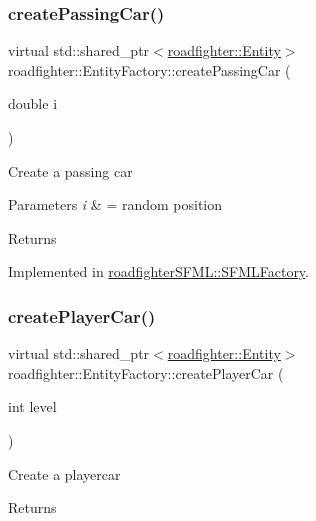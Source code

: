 \subsubsection{\texorpdfstring{create\+Passing\+Car()}{createPassingCar()}}
{\footnotesize\ttfamily virtual std\+::shared\+\_\+ptr$<$\hyperlink{classroadfighter_1_1Entity}{roadfighter\+::\+Entity}$>$ roadfighter\+::\+Entity\+Factory\+::create\+Passing\+Car (\begin{DoxyParamCaption}\item[{double}]{i }\end{DoxyParamCaption})\hspace{0.3cm}{\ttfamily [pure virtual]}}

Create a passing car 
\begin{DoxyParams}{Parameters}
{\em i} & = random position \\
\hline
\end{DoxyParams}
\begin{DoxyReturn}{Returns}

\end{DoxyReturn}


Implemented in \hyperlink{classroadfighterSFML_1_1SFMLFactory_a9960aec21f58babf83857cc400dad8fe}{roadfighter\+S\+F\+M\+L\+::\+S\+F\+M\+L\+Factory}.

\mbox{\label{classroadfighter_1_1EntityFactory_a8fefd94a197c87544805461761fc111c}} 
\subsubsection{\texorpdfstring{create\+Player\+Car()}{createPlayerCar()}}
{\footnotesize\ttfamily virtual std\+::shared\+\_\+ptr$<$\hyperlink{classroadfighter_1_1Entity}{roadfighter\+::\+Entity}$>$ roadfighter\+::\+Entity\+Factory\+::create\+Player\+Car (\begin{DoxyParamCaption}\item[{int}]{level }\end{DoxyParamCaption})\hspace{0.3cm}{\ttfamily [pure virtual]}}

Create a playercar \begin{DoxyReturn}{Returns}

\end{DoxyReturn}


